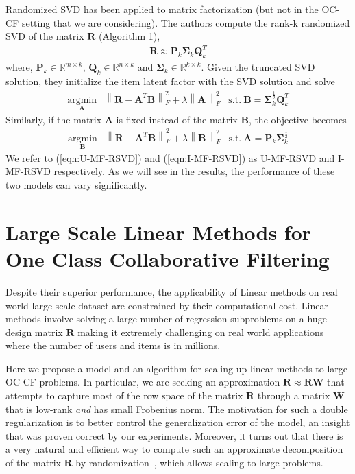 \documentclass{article}
\newcommand{\citep}{\cite}
\newcommand{\R}{\mathbf{R}}
\newcommand{\A}{\mathbf{A}}
\newcommand{\B}{\mathbf{B}}
\newcommand{\Sig}{\mathbf{\Sigma}}
\renewcommand{\P}{\mathbf{P}}
\newcommand{\Q}{\mathbf{Q}}
\newcommand{\W}{\mathbf{W}}
\begin{document}
Randomized SVD has been applied to matrix factorization \citep{Tang:2013}
(but not in the OC-CF setting that we are considering).
The authors compute the rank-k randomized SVD of the matrix $\R$ (Algorithm 1),
\begin{align}
	\label{eqn:truncatedSVD}
	\R \approx \P_k \Sig_k \Q^T_k
\end{align}
where, $\P_k \in \mathbb{R}^{m \times k}$, $\Q_k \in \mathbb{R}^{n \times k}$ and $\Sig_k \in \mathbb{R}^{k \times k}$. Given the truncated SVD solution, they initialize the item latent factor with the SVD solution and solve
\begin{align} \label{eqn:I-MF-RSVD}
\underset{\A}{\mathrm{argmin}} & \left \| \R - \A^T\B\right \|_F^2 + \lambda \left \|  \A \right \|_F^2 & \text{s.t.}\  \B = \Sig_k^{\frac{1}{2}} \Q^T_k
\end{align}
Similarly, if the matrix $\A$ is fixed instead of the matrix $\B$, the objective becomes
\begin{align}
\label{eqn:U-MF-RSVD}
\underset{\B}{\mathrm{argmin}} & \left \| \R - \A^T\B\right \|_F^2 + \lambda \left \|  \B \right \|_F^2 & \text{s.t.}\  \A = \P_k \Sig_k^{\frac{1}{2}}
\end{align}
We refer to (\ref{eqn:U-MF-RSVD}) and (\ref{eqn:I-MF-RSVD}) as U-MF-RSVD and I-MF-RSVD respectively. As we will see in the results, the performance of these two models can vary significantly.


\section{Large Scale Linear Methods for One Class Collaborative Filtering}
Despite their superior performance, the applicability of Linear methods on real world large scale dataset are constrained by their computational cost. Linear methods involve solving  a large number of regression subproblems on a huge design matrix $\R$ making it extremely challenging on real world applications where the number of users and items is in millions.

Here we propose a model and an algorithm for scaling up linear methods to large OC-CF problems.
In particular, we are seeking an approximation $\R \approx \R \W$ that attempts to capture most of the row space of the matrix $\R$ through a matrix $\W$ that is low-rank {\em and} has small Frobenius norm. The motivation for such a double regularization is to better control the generalization error of the model, an insight that was proven correct by our experiments. Moreover, it turns out that there is a very natural and efficient way to compute such an approximate decomposition of the matrix $\R$ by randomization~\citep{halko2011}, which allows scaling to large problems.
\end{document}
